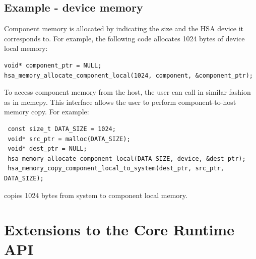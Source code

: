 \documentclass[final]{book}
\begin{document}
\subsection{Example - device memory}
Component memory is allocated by indicating the size and the HSA device it
corresponds to. For example, the following code allocates 1024 bytes of device
local memory:

\begin{lstlisting}
void* component_ptr = NULL;
hsa_memory_allocate_component_local(1024, component, &component_ptr);
\end{lstlisting}

To access component memory from the host, the user can call
 in similar fashion as in
memcpy. This interface allows the user to perform component-to-host memory
copy. For example:

\begin{lstlisting}
 const size_t DATA_SIZE = 1024;
 void* src_ptr = malloc(DATA_SIZE);
 void* dest_ptr = NULL;
 hsa_memory_allocate_component_local(DATA_SIZE, device, &dest_ptr);
 hsa_memory_copy_component_local_to_system(dest_ptr, src_ptr, DATA_SIZE);
\end{lstlisting}

copies 1024 bytes from system to component local memory.



% 


\section{Extensions to the Core Runtime API}\label{extensions}
\end{document}
